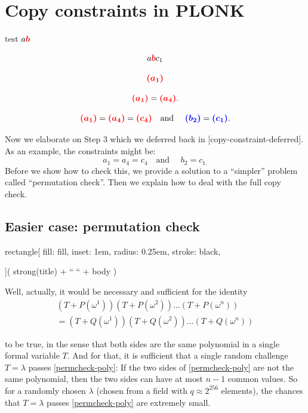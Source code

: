 \documentclass{article}
\newcommand{\redoval}[1]{\textcolor{red}{\boldsymbol{#1}}}
\newcommand{\bluerect}[1]{\textcolor{blue}{\boldsymbol{#1}}}
\begin{document}
\section{Copy constraints in PLONK}\label{copy-constraints}

test $a \redoval{b}$

\[a \redoval{b}  c_1 \]

\[ \redoval{(a_1)} \]

\[ \redoval{(a_{1})} = 
\redoval{(a_{4})} .\]

\[ \redoval{(a_{1})} = 
\redoval{(a_{4})} = 
\redoval{(c_{4})}
\quad\text{and }\quad \bluerect{(b_{2})} = \bluerect{(c_{1})}.\]

Now we elaborate on Step 3 which we deferred back in
{[}copy-constraint-deferred{]}. As an example, the constraints might be:
\[a_{1} = a_{4} = c_{4}\quad\text{and }\quad b_{2} = c_{1.}\] Before we
show how to check this, we provide a solution to a ``simpler'' problem
called ``permutation check''. Then we explain how to deal with the full
copy check.

\subsection{Easier case: permutation check}

rectangle{[} fill: fill, inset: 1em, radius: 0.25em, stroke: black,

{]}( strong(title) + `` `` + body )

Well, actually, it would be necessary and sufficient for the identity
\[\begin{array}{r}
\left( T + P\left( \omega^{1} \right) \right)\left( T + P\left( \omega^{2} \right) \right)\ldots\left( T + P\left( \omega^{n} \right) \right) \\
 = \left( T + Q\left( \omega^{1} \right) \right)\left( T + Q\left( \omega^{2} \right) \right)\ldots\left( T + Q\left( \omega^{n} \right) \right)
\end{array}\] \label{permcheck-poly}{}

to be true, in the sense that both sides are the same polynomial in a
single formal variable \(T\). And for that, it is sufficient that a
single random challenge \(T = \lambda\) passes
\hyperref[permcheck-poly]{{[}permcheck-poly{]}}: If the two sides of
\hyperref[permcheck-poly]{{[}permcheck-poly{]}} are not the same
polynomial, then the two sides can have at most \(n - 1\) common values.
So for a randomly chosen \(\lambda\) (chosen from a field with
\(q \approx 2^{256}\) elements), the chances that \(T = \lambda\) passes
\hyperref[permcheck-poly]{{[}permcheck-poly{]}} are extremely small.
\end{document}
